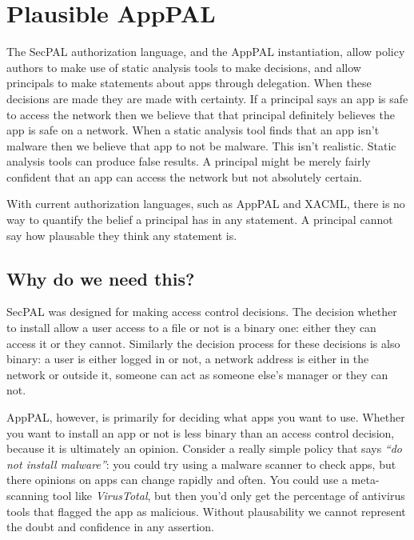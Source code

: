 \documentclass[thesis.tex]{subfiles}
\begin{document}
\section{Plausible AppPAL}


\newcommand{\secpalmath}[1]{\ensuremath\texttt{#1}}
\newcommand{\AC}[0]{\ensuremath\text{AC}}
\newcommand{\says}[1]{\ensuremath~\secpalmath{says}^{\new{#1}}~}
\newcommand{\canSay}[1]{\secpalmath{can-say}_{#1}}
\newcommand{\canActAs}[0]{\secpalmath{can-act-as}}
\newcommand{\spif}[0]{\secpalmath{if}}
\newcommand{\where}[0]{\secpalmath{where}}

The SecPAL authorization language, and the AppPAL instantiation, allow
policy authors to make use of static analysis tools to make decisions,
and allow principals to make statements about apps through delegation.
When these decisions are made they are made with certainty.  If a
principal says an app is safe to access the network then we believe
that that principal definitely believes the app is safe on a network.
When a static analysis tool finds that an app isn't malware then we
believe that app to not be malware.  This isn't realistic.  Static
analysis tools can produce false results.  A principal might be merely
fairly confident that an app can access the network but not absolutely
certain.

With current authorization languages, such as AppPAL and XACML, there
is no way to quantify the belief a principal has in any statement.  A
principal cannot say how plausable they think any statement is.

\subsection{Why do we need this?}

SecPAL was designed for making access control decisions.  The decision
whether to install allow a user access to a file or not is a binary
one: either they can access it or they cannot.  Similarly the decision
process for these decisions is also binary: a user is either logged in
or not, a network address is either in the network or outside it,
someone can act as someone else's manager or they can not.

AppPAL, however, is primarily for deciding what apps you want to use.
Whether you want to install an app or not is less binary than an
access control decision, because it is ultimately an opinion.
Consider a really simple policy that says \emph{``do not install
malware''}: you could try using a malware scanner to check apps, but
there opinions on apps can change rapidly and often.  You could use a
meta-scanning tool like \emph{VirusTotal}, but then you'd only get the
percentage of antivirus tools that flagged the app as malicious.
Without plausability we cannot represent the doubt and confidence in
any assertion.
\end{document}
